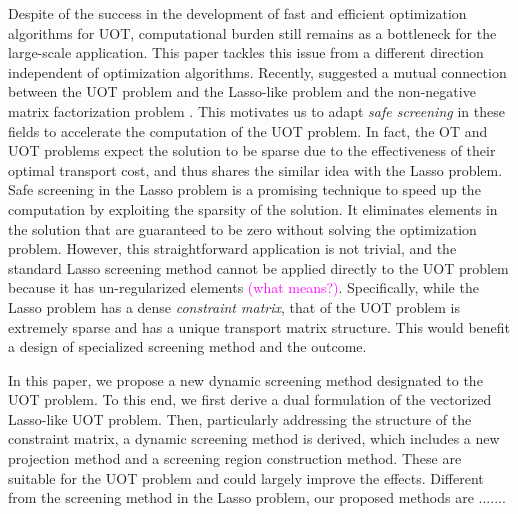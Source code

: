 \documentclass[twoside]{article}
\theoremstyle{plain}
\newcommand{\note}[1]{\textcolor{magenta}{#1}}
\begin{document}
Despite of the success in the development of fast and efficient optimization algorithms for UOT, computational burden still remains as a bottleneck for the large-scale application. This paper tackles this issue from a different direction independent of optimization algorithms. Recently, \cite{Chapel_NeurIPS_2021} suggested a mutual connection between the UOT problem and the Lasso-like problem \citep{Tibshirani_JRSS_1996,Efron_AM_2004} and the non-negative matrix factorization problem \citep{Lee_NIPS_2000}. This motivates us to adapt {\it safe screening} \citep{ghaoui2010safe} in these fields to accelerate the computation of the UOT problem. In fact, the OT and UOT problems expect the solution to be sparse due to the effectiveness of their optimal transport cost, and thus shares the similar idea with the Lasso problem. 
Safe screening in the Lasso problem is a promising technique to speed up the computation by exploiting the sparsity of the solution. It eliminates elements in the solution that are guaranteed to be zero without solving the optimization problem. However, this straightforward application is not trivial, and the standard Lasso screening method cannot be applied directly to the UOT problem because it has un-regularized elements \note{(what means?)}. 
Specifically, while the Lasso problem has a dense {\it constraint matrix}, that of the UOT problem is extremely sparse and has a unique transport matrix structure. This would benefit a design of specialized screening method and the outcome. 
%


In this paper, we propose a new dynamic screening method designated to the UOT problem. To this end, we first derive a dual formulation of the vectorized Lasso-like UOT problem. Then, particularly addressing the structure of the constraint matrix, a dynamic screening method is derived, which includes a new projection method and a screening region construction method. These are suitable for the UOT problem and could largely improve the effects. Different from the screening method in the Lasso problem, our proposed methods are .......
\end{document}
